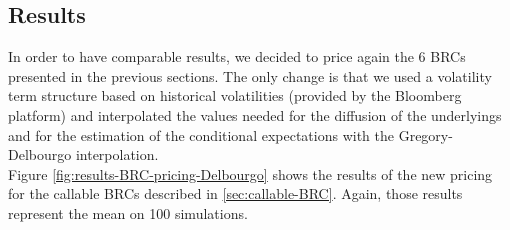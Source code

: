 \documentclass[a4paper,11pt,english]{book}
\begin{document}
\subsection{Results}
In order to have comparable results, we decided to price again the 6 BRCs presented in the previous sections. The only change is that we used a volatility term structure based on historical volatilities (provided by the Bloomberg platform) and interpolated the values needed for the diffusion of the underlyings and for the estimation of the conditional expectations with the Gregory-Delbourgo interpolation.\\

Figure \ref{fig:results-BRC-pricing-Delbourgo} shows the results of the new pricing for the callable BRCs described in \ref{sec:callable-BRC}. Again, those results represent the mean on 100 simulations.
\end{document}
